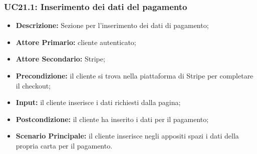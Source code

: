 \subsubsection{UC21.1: Inserimento dei dati del pagamento}
\label{sec:UC21.1}
\begin{itemize}
    \item \textbf{Descrizione:} Sezione per l'inserimento dei dati di pagamento;
    \item \textbf{Attore Primario:} cliente autenticato;
    \item \textbf{Attore Secondario:} Stripe;
    \item \textbf{Precondizione:} il cliente si trova nella piattaforma di Stripe per completare il checkout;
    \item \textbf{Input:} il cliente inserisce i dati richiesti dalla pagina;
    \item \textbf{Postcondizione:} il cliente ha inserito i dati per il pagamento;
    \item \textbf{Scenario Principale:} il cliente inserisce negli appositi spazi i dati della propria carta per il pagamento.
\end{itemize}